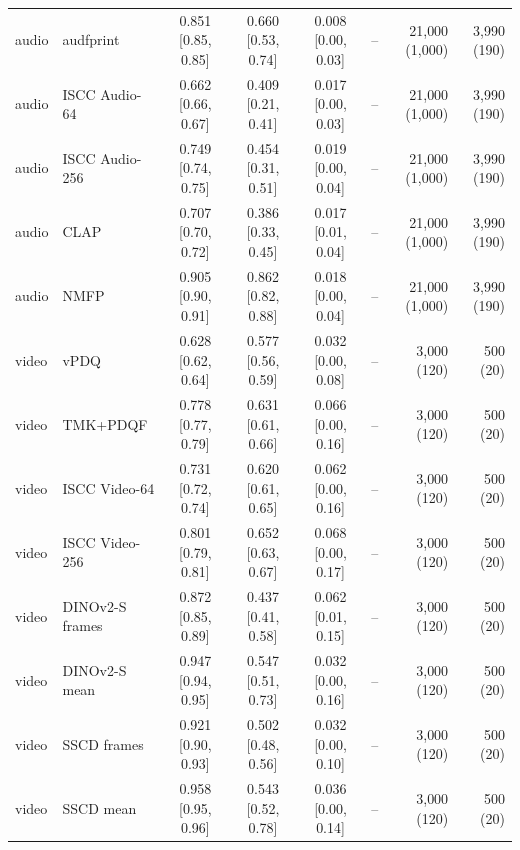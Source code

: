 \begin{table}[!t]
\begin{tabular}{llccccrr}
audio & audfprint & 0.851 \tiny[0.85, 0.85] & 0.660 \tiny[0.53, 0.74] & 0.008 \tiny[0.00, 0.03] & -- & 21{,}000 (1{,}000) & 3{,}990 (190) \\
audio & ISCC Audio-64 & 0.662 \tiny[0.66, 0.67] & 0.409 \tiny[0.21, 0.41] & 0.017 \tiny[0.00, 0.03] & -- & 21{,}000 (1{,}000) & 3{,}990 (190) \\
audio & ISCC Audio-256 & 0.749 \tiny[0.74, 0.75] & 0.454 \tiny[0.31, 0.51] & 0.019 \tiny[0.00, 0.04] & -- & 21{,}000 (1{,}000) & 3{,}990 (190) \\
audio & CLAP & 0.707 \tiny[0.70, 0.72] & 0.386 \tiny[0.33, 0.45] & 0.017 \tiny[0.01, 0.04] & -- & 21{,}000 (1{,}000) & 3{,}990 (190) \\
audio & NMFP & 0.905 \tiny[0.90, 0.91] & 0.862 \tiny[0.82, 0.88] & 0.018 \tiny[0.00, 0.04] & -- & 21{,}000 (1{,}000) & 3{,}990 (190) \\
video & vPDQ & 0.628 \tiny[0.62, 0.64] & 0.577 \tiny[0.56, 0.59] & 0.032 \tiny[0.00, 0.08] & -- & 3{,}000 (120) & 500 (20) \\
video & TMK+PDQF & 0.778 \tiny[0.77, 0.79] & 0.631 \tiny[0.61, 0.66] & 0.066 \tiny[0.00, 0.16] & -- & 3{,}000 (120) & 500 (20) \\
video & ISCC Video-64 & 0.731 \tiny[0.72, 0.74] & 0.620 \tiny[0.61, 0.65] & 0.062 \tiny[0.00, 0.16] & -- & 3{,}000 (120) & 500 (20) \\
video & ISCC Video-256 & 0.801 \tiny[0.79, 0.81] & 0.652 \tiny[0.63, 0.67] & 0.068 \tiny[0.00, 0.17] & -- & 3{,}000 (120) & 500 (20) \\
video & DINOv2-S frames & 0.872 \tiny[0.85, 0.89] & 0.437 \tiny[0.41, 0.58] & 0.062 \tiny[0.01, 0.15] & -- & 3{,}000 (120) & 500 (20) \\
video & DINOv2-S mean & 0.947 \tiny[0.94, 0.95] & 0.547 \tiny[0.51, 0.73] & 0.032 \tiny[0.00, 0.16] & -- & 3{,}000 (120) & 500 (20) \\
video & SSCD frames & 0.921 \tiny[0.90, 0.93] & 0.502 \tiny[0.48, 0.56] & 0.032 \tiny[0.00, 0.10] & -- & 3{,}000 (120) & 500 (20) \\
video & SSCD mean & 0.958 \tiny[0.95, 0.96] & 0.543 \tiny[0.52, 0.78] & 0.036 \tiny[0.00, 0.14] & -- & 3{,}000 (120) & 500 (20) \\
\bottomrule
\end{tabular}

\end{table}
